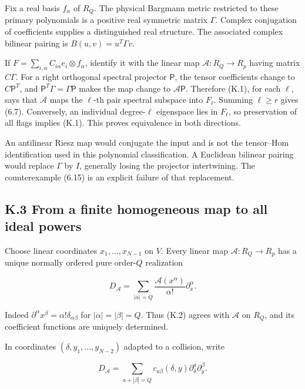 \documentclass[a4paper,11pt]{article}
\numberwithin{equation}{section}
\begin{document}
Fix a real basis \(f_\alpha\) of \(R_Q\). The physical Bargmann metric restricted to these primary polynomials is a positive real symmetric matrix \(\Gamma\). Complex conjugation of coefficients supplies a distinguished real structure. The associated complex bilinear pairing is \(B(u,v)=u^T\Gamma v\).

If \(F=\sum_{i,\alpha}C_{i\alpha}e_i\otimes f_\alpha\), identify it with the linear map \(\mathcal A:R_Q\to R_p\) having matrix \(C\Gamma\). For a right orthogonal spectral projector \(\mathsf P\), the tensor coefficients change to \(C\mathsf P^T\), and \(\mathsf P^T\Gamma=\Gamma\mathsf P\) makes the map change to \(\mathcal A\mathsf P\). Therefore (K.1), for each \(\ell\), says that \(\mathcal A\) maps the \(\ell\)-th pair spectral subspace into \(F_\ell\). Summing \(\ell\ge r\) gives (6.7). Conversely, an individual degree-\(\ell\) eigenspace lies in \(F_\ell\), so preservation of all flags implies (K.1). This proves equivalence in both directions.

An antilinear Riesz map would conjugate the input and is not the tensor--Hom identification used in this polynomial classification. A Euclidean bilinear pairing would replace \(\Gamma\) by \(I\), generally losing the projector intertwining. The counterexample (6.15) is an explicit failure of that replacement.

\hypertarget{k.3-from-a-finite-homogeneous-map-to-all-ideal-powers}{%
\subsection{K.3 From a finite homogeneous map to all ideal powers}\label{k.3-from-a-finite-homogeneous-map-to-all-ideal-powers}}

Choose linear coordinates \(x_1,\ldots,x_{N-1}\) on \(V\). Every linear map \(\mathcal A:R_Q\to R_p\) has a unique normally ordered pure order-\(Q\) realization

\[
D_{\mathcal A}=\sum_{|\alpha|=Q}
\frac{\mathcal A(x^\alpha)}{\alpha!}\partial_x^\alpha.
\tag{K.2}
\]

Indeed \(\partial^\alpha x^\beta=\alpha!\delta_{\alpha\beta}\) for \(|\alpha|=|\beta|=Q\). Thus (K.2) agrees with \(\mathcal A\) on \(R_Q\), and its coefficient functions are uniquely determined.

In coordinates \((\delta,y_1,\ldots,y_{N-2})\) adapted to a collision, write

\[
D_{\mathcal A}=\sum_{a+|\beta|=Q}c_{a\beta}(\delta,y)
\partial_\delta^a\partial_y^\beta.
\tag{K.3}
\]
\end{document}
